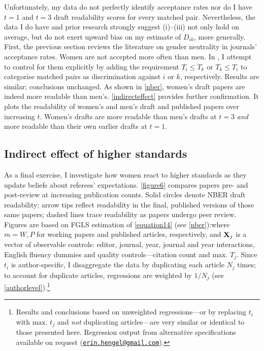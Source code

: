 Unfortunately, my data do not perfectly identify acceptance rates nor do I have $t=1$ and $t=3$ draft readability scores for every matched pair. Nevertheless, the data I do have and prior research strongly suggest (i)--(iii) not only hold on average, but do not exert upward bias on my estimate of $D_{ik}$, more generally. First, the previous section reviews the literature on gender neutrality in journals' acceptance rates. Women are not accepted more often than men. In , I attempt to control for them explicitly by adding the requirement $T_i\le T_k$ or $T_k\le T_i$ to categorise matched pairs as discrimination against $i$ or $k$, respectively. Results are similar; conclusions unchanged. As shown in \autoref{nber}, women's draft papers are indeed more readable than men's. \autoref{indirecteffect} provides further confirmation. It plots the readability of women's and men's draft and published papers over increasing $t$. Women's drafts are more readable than men's drafts at $t=3$ \emph{and} more readable than their own earlier drafts at $t=1$.

\subsection{Indirect effect of higher standards}
\label{indirecteffect}

As a final exercise, I investigate how women react to higher standards as they update beliefs about referees' expectations. \autoref{figure6} compares papers pre- and post-review at increasing publication counts. Solid circles denote NBER draft readability; arrow tips reflect readability in the final, published versions of those same papers; dashed lines trace readability as papers undergo peer review. Figures are based on FGLS estimation of \autoref{equation14} (see \autoref{nber}):where $m=W,P$ for working papers and published articles, respectively, and $\mathbf{X}_j$ is a vector of observable controls: editor, journal, year, journal and year interactions, English fluency dummies and quality controls---citation count and $\text{max. }T_j$. Since $t_i$ is author-specific, I disaggregate the data by duplicating each article $N_j$ times; to account for duplicate articles, regressions are weighted by $1/N_j$ (see \autoref{authorlevel}).\footnote{Results and conclusions based on unweighted regressions---or by replacing $t_i$ with $\text{max. }t_j$ and \emph{not} duplicating articles---are very similar or identical to those presented here. Regression output from alternative specifications available on request (\href{mailto:erin.hengel@gmail.com}{\texttt{erin.hengel@gmail.com}}).}

